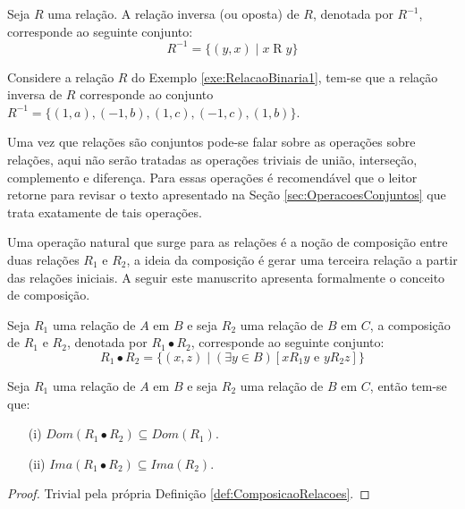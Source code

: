 \begin{definition}\label{def:RelacaoInversa}
	Seja $R$ uma relação. A relação inversa (ou oposta) de $R$, denotada por $R^{-1}$, corresponde ao seguinte conjunto:
	$$R^{-1} = \{(y,x) \mid x\mathrel{R}y\}$$
\end{definition}

\begin{exem}
	Considere a relação $R$ do Exemplo \ref{exe:RelacaoBinaria1}, tem-se que a relação inversa de $R$ corresponde ao conjunto $R^{-1} = \{(1, a), (-1, b), (1, c), (-1, c), (1, b)\}$.
\end{exem}

Uma vez que relações são conjuntos pode-se falar sobre as operações sobre relações, aqui não serão tratadas as operações triviais de união, interseção, complemento e diferença. Para essas operações é recomendável que o leitor retorne para revisar o texto apresentado na Seção \ref{sec:OperacoesConjuntos} que trata exatamente de tais operações. 

Uma operação natural que surge para as relações é a noção de composição entre duas relações $R_1$ e $R_2$, a ideia da composição é gerar uma terceira relação a partir das relações iniciais. A seguir este manuscrito apresenta formalmente o conceito de composição.

\begin{definition}\label{def:ComposicaoRelacoes}
	Seja $R_1$ uma relação de $A$ em $B$ e seja $R_2$ uma relação de $B$ em $C$, a composição de $R_1$ e $R_2$, denotada por $R_1 \bullet R_2$, corresponde ao seguinte conjunto:
	$$R_1 \bullet R_2 = \{(x, z) \mid (\exists y \in B)[x\mathrel{R_1}y \text{ e } y\mathrel{R_2}z] \}$$ 
\end{definition}

\begin{prop}
	Seja $R_1$ uma relação de $A$ em $B$ e seja $R_2$ uma relação de $B$ em $C$, então tem-se que:
	\begin{itemize}
		\item[(i)] $Dom(R_1 \bullet R_2) \subseteq Dom(R_1)$.
		\item[(ii)] $Ima(R_1 \bullet R_2) \subseteq Ima(R_2)$.
	\end{itemize}
\end{prop}

\begin{proof}
	Trivial pela própria Definição \ref{def:ComposicaoRelacoes}.
\end{proof}

